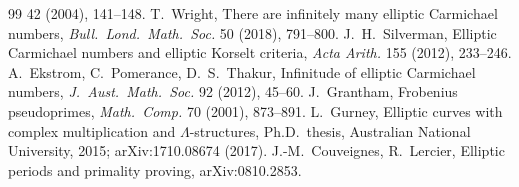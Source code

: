 \documentclass[11pt]{article}
\theoremstyle{remark}
\begin{document}
\begin{thebibliography}{99}
42 (2004), 141--148.
 T.~Wright, There are infinitely many elliptic Carmichael
numbers, \emph{Bull.\ Lond.\ Math.\ Soc.} 50 (2018), 791--800.
 J.~H.~Silverman, Elliptic Carmichael numbers and
elliptic Korselt criteria, \emph{Acta Arith.} 155 (2012), 233--246.
 A.~Ekstrom, C.~Pomerance, D.~S.~Thakur, Infinitude of
elliptic Carmichael numbers, \emph{J.\ Aust.\ Math.\ Soc.} 92 (2012),
45--60.
 J.~Grantham, Frobenius pseudoprimes, \emph{Math.\ Comp.}
70 (2001), 873--891.
 L.~Gurney, Elliptic curves with complex multiplication
and $\Lambda$-structures, Ph.D.\ thesis, Australian National University,
2015; arXiv:1710.08674 (2017).
 J.-M.~Couveignes, R.~Lercier, Elliptic periods
and primality proving, arXiv:0810.2853.
\end{thebibliography}
\end{document}
